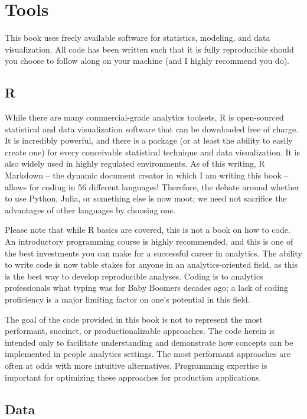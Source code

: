 \documentclass[
]{book}
\begin{document}
\hypertarget{tools}{%
\section{Tools}\label{tools}}

This book uses freely available software for statistics, modeling, and data visualization. All code has been written such that it is fully reproducible should you choose to follow along on your machine (and I highly recommend you do).

\hypertarget{r}{%
\subsection{R}\label{r}}

While there are many commercial-grade analytics toolsets, R is open-sourced statistical and data visualization software that can be downloaded free of charge. It is incredibly powerful, and there is a package (or at least the ability to easily create one) for every conceivable statistical technique and data visualization. It is also widely used in highly regulated environments. As of this writing, R Markdown -- the dynamic document creator in which I am writing this book -- allows for coding in 56 different languages! Therefore, the debate around whether to use Python, Julia, or something else is now moot; we need not sacrifice the advantages of other languages by choosing one.

Please note that while R basics are covered, this is not a book on how to code. An introductory programming course is highly recommended, and this is one of the best investments you can make for a successful career in analytics. The ability to write code is now table stakes for anyone in an analytics-oriented field, as this is the best way to develop reproducible analyses. Coding is to analytics professionals what typing was for Baby Boomers decades ago; a lack of coding proficiency is a major limiting factor on one's potential in this field.

The goal of the code provided in this book is not to represent the most performant, succinct, or productionalizable approaches. The code herein is intended only to facilitate understanding and demonstrate how concepts can be implemented in people analytics settings. The most performant approaches are often at odds with more intuitive alternatives. Programming expertise is important for optimizing these approaches for production applications.

\hypertarget{data}{%
\subsection{Data}\label{data}}
\end{document}
